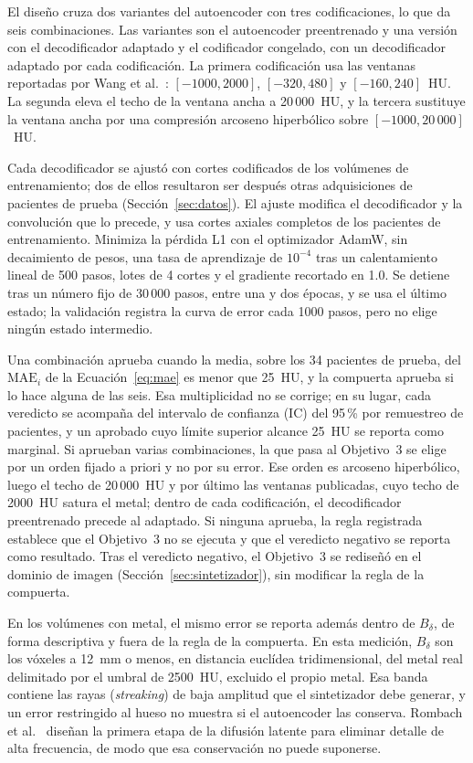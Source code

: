 El diseño cruza dos variantes del autoencoder con tres codificaciones, lo que da seis combinaciones. Las variantes son el autoencoder preentrenado y una versión con el decodificador adaptado y el codificador congelado, con un decodificador adaptado por cada codificación. La primera codificación usa las ventanas reportadas por Wang et al.~\cite{wang2025adaptiveweighting}: $[-1000, 2000]$, $[-320, 480]$ y $[-160, 240]$~HU. La segunda eleva el techo de la ventana ancha a 20\,000~HU, y la tercera sustituye la ventana ancha por una compresión arcoseno hiperbólico sobre $[-1000, 20\,000]$~HU.

Cada decodificador se ajustó con cortes codificados de los volúmenes de entrenamiento; dos de ellos resultaron ser después otras adquisiciones de pacientes de prueba (Sección~\ref{sec:datos}). El ajuste modifica el decodificador y la convolución que lo precede, y usa cortes axiales completos de los pacientes de entrenamiento. Minimiza la pérdida L1 con el optimizador AdamW, sin decaimiento de pesos, una tasa de aprendizaje de $10^{-4}$ tras un calentamiento lineal de 500 pasos, lotes de 4 cortes y el gradiente recortado en 1.0. Se detiene tras un número fijo de 30\,000 pasos, entre una y dos épocas, y se usa el último estado; la validación registra la curva de error cada 1000 pasos, pero no elige ningún estado intermedio.

Una combinación aprueba cuando la media, sobre los 34 pacientes de prueba, del $\mathrm{MAE}_i$ de la Ecuación~\eqref{eq:mae} es menor que 25~HU, y la compuerta aprueba si lo hace alguna de las seis. Esa multiplicidad no se corrige; en su lugar, cada veredicto se acompaña del intervalo de confianza (IC) del 95\,\% por remuestreo de pacientes, y un aprobado cuyo límite superior alcance 25~HU se reporta como marginal. Si aprueban varias combinaciones, la que pasa al Objetivo~3 se elige por un orden fijado a priori y no por su error. Ese orden es arcoseno hiperbólico, luego el techo de 20\,000~HU y por último las ventanas publicadas, cuyo techo de 2000~HU satura el metal; dentro de cada codificación, el decodificador preentrenado precede al adaptado. Si ninguna aprueba, la regla registrada establece que el Objetivo~3 no se ejecuta y que el veredicto negativo se reporta como resultado. Tras el veredicto negativo, el Objetivo~3 se rediseñó en el dominio de imagen (Sección~\ref{sec:sintetizador}), sin modificar la regla de la compuerta.

En los volúmenes con metal, el mismo error se reporta además dentro de $B_{\delta}$, de forma descriptiva y fuera de la regla de la compuerta. En esta medición, $B_{\delta}$ son los vóxeles a 12~mm o menos, en distancia euclídea tridimensional, del metal real delimitado por el umbral de 2500~HU, excluido el propio metal. Esa banda contiene las rayas (\emph{streaking}) de baja amplitud que el sintetizador debe generar, y un error restringido al hueso no muestra si el autoencoder las conserva. Rombach et al.~\cite{rombach2022latentdiffusion} diseñan la primera etapa de la difusión latente para eliminar detalle de alta frecuencia, de modo que esa conservación no puede suponerse.

